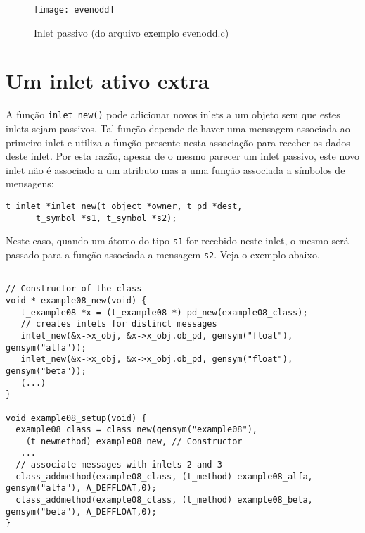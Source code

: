 \begin{figure}[h!]
\centering
\texttt{[image: evenodd]}
\caption{Inlet passivo (do arquivo exemplo evenodd.c)}
\label{fig:inlet-passivo}
\end{figure}


\section{Um inlet ativo extra}

A função \texttt{inlet\_new()} pode adicionar novos inlets a um objeto sem que 
estes inlets sejam passivos.
Tal função depende de haver uma mensagem associada ao primeiro inlet e utiliza
a função presente nesta associação para receber os dados deste inlet.
Por esta razão, apesar de o mesmo parecer um inlet passivo,
este novo inlet não é associado a um atributo mas a uma função associada a
símbolos de mensagens:

\begin{lstlisting}[caption=Criando inlets ativos extras]
t_inlet *inlet_new(t_object *owner, t_pd *dest,
      t_symbol *s1, t_symbol *s2);
\end{lstlisting}

Neste caso, quando um átomo do tipo \texttt{s1} for recebido neste inlet, o
mesmo será passado para a função associada a mensagem \texttt{s2}.
Veja o exemplo abaixo.

\begin{lstlisting}

// Constructor of the class
void * example08_new(void) {
   t_example08 *x = (t_example08 *) pd_new(example08_class);
   // creates inlets for distinct messages
   inlet_new(&x->x_obj, &x->x_obj.ob_pd, gensym("float"), gensym("alfa"));
   inlet_new(&x->x_obj, &x->x_obj.ob_pd, gensym("float"), gensym("beta"));
   (...)
}

void example08_setup(void) {
  example08_class = class_new(gensym("example08"),
    (t_newmethod) example08_new, // Constructor
   ...
  // associate messages with inlets 2 and 3
  class_addmethod(example08_class, (t_method) example08_alfa, gensym("alfa"), A_DEFFLOAT,0); 
  class_addmethod(example08_class, (t_method) example08_beta, gensym("beta"), A_DEFFLOAT,0); 
}
\end{lstlisting}


